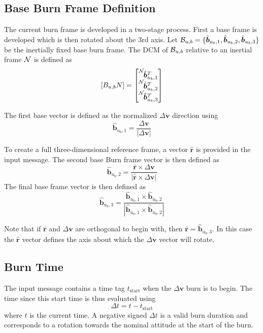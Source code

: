 \subsection{Base Burn Frame Definition}
The current burn frame is developed in a two-stage process.  First a base frame is developed which is then rotated about the 3rd axis.  Let ${\cal B}_{u,b} = \{\hat{\bm b}_{u_{b},1}, \hat{\bm b}_{u_{b},2}, \hat{\bm b}_{u_{b},3} \}$ be the inertially fixed base burn frame.  The DCM of ${\cal B}_{u,b}$ relative to an inertial frame $\cal N$ is defined as
\begin{equation}
	\label{eq:dvAttGuid0}
	[B_{u,b}N] = \begin{bmatrix}
		\leftexp{N}{\hat{\bm b}_{u_{b},1}}^{T} \\
		\leftexp{N}{\hat{\bm b}_{u_{b},2}}^{T} \\
		\leftexp{N}{\hat{\bm b}_{u_{b},3}}^{T} 		
	\end{bmatrix}
\end{equation}

The first base vector is defined as the normalized $\Delta\bm v$ direction using
\begin{equation}
	\label{eq:dvAttGuid1}
		\hat{\bm b}_{u_{b},1} = \frac{\Delta\bm v}{|\Delta \bm v|}
\end{equation}

To create a full three-dimensional reference frame, a vector $\hat{\bm r}$ is provided in the input message.  The second base Burn frame vector is then defined as
\begin{equation}
	\label{eq:dvAttGuid2}
		\hat{\bm b}_{u_{b},2} = \frac{\hat{\bm r} \times \Delta\bm v}{|\hat{\bm r} \times \Delta \bm v|}
\end{equation}
The final base frame vector is then defined as
\begin{equation}
	\label{eq:dvAttGuid3}
		\hat{\bm b}_{u_{b},3} = \frac{ \hat{\bm b}_{u_{b},1} \times \hat{\bm b}_{u_{b},2}}{|  \hat{\bm b}_{u_{b},1} \times \hat{\bm b}_{u_{b},2} |}
\end{equation}

Note that if $\hat{\bm r}$ and $\Delta\bm v$ are orthogonal to begin with, then $\hat{\bm r} = \hat{\bm b}_{u_{b},3}$.  In this case the $\hat{\bm r}$ vector defines the axis about which the $\Delta \bm v$ vector will rotate.  


\subsection{Burn Time}
The input message contains a time tag $t_{\text{start}}$ when the $\Delta\bm v$ burn is to begin.  The time since this start time is thus evaluated using
\begin{equation}
	\label{eq:dvAttGuid4}
		\Delta t = t - t_{\text{start}}
\end{equation}
where $t$ is the current time. A negative signed $\Delta t$ is a valid burn duration and corresponds to a rotation towards the nominal attitude at the start of the burn.

